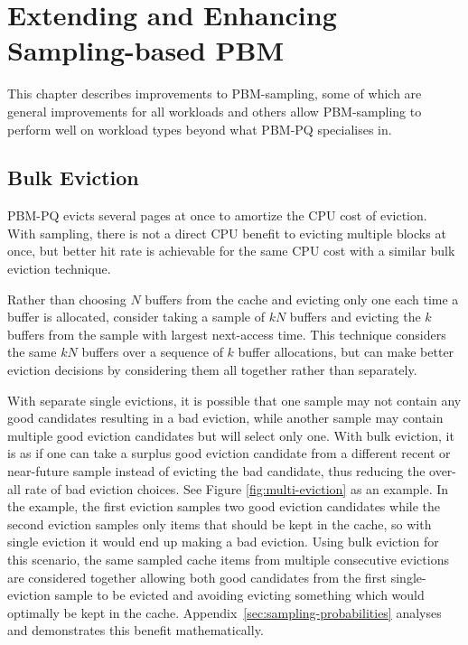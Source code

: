
\chapter{Extending and Enhancing Sampling-based PBM}
\label{ch:extending-sampling}
This chapter describes improvements to PBM-sampling, some of which are general improvements for all workloads and others allow PBM-sampling to perform well on workload types beyond what PBM-PQ specialises in.

\section{Bulk Eviction\label{sec:sampling-bulk-eviction}}

PBM-PQ evicts several pages at once to amortize the CPU cost of eviction.~\cite{pbm} With sampling, there is not a direct CPU benefit to evicting multiple blocks at once, but better hit rate is achievable for the same CPU cost with a similar bulk eviction technique.

Rather than choosing $N$ buffers from the cache and evicting only one each time a buffer is allocated, consider taking a sample of $kN$ buffers and evicting the $k$ buffers from the sample with largest next-access time. This technique considers the same $kN$ buffers over a sequence of $k$ buffer allocations, but can make better eviction decisions by considering them all together rather than separately.

With separate single evictions, it is possible that one sample may not contain any good candidates resulting in a bad eviction, while another sample may contain multiple good eviction candidates but will select only one. With bulk eviction, it is as if one can take a surplus good eviction candidate from a different recent or near-future sample instead of evicting the bad candidate, thus reducing the over-all rate of bad eviction choices. See Figure \ref{fig:multi-eviction} as an example. In the example, the first eviction samples two good eviction candidates while the second eviction samples only items that should be kept in the cache, so with single eviction it would end up making a bad eviction. Using bulk eviction for this scenario, the same sampled cache items from multiple consecutive evictions are considered together allowing both good candidates from the first single-eviction sample to be evicted and avoiding evicting something which would optimally be kept in the cache. Appendix~\ref{sec:sampling-probabilities} analyses and demonstrates this benefit mathematically.


